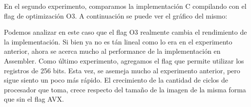 \documentclass[a4paper]{article}
\begin{document}
En el segundo experimento, comparamos la implementación C compilando con el flag de optimización O3. A continuación se puede ver el gráfico del mismo:
\begin{figure}[!ht]
    \centering
    \begin{floatrow}
    \end{floatrow}
\end{figure}
Podemos analizar en este caso que el flag O3 realmente cambia el rendimiento de la implementación. Si bien ya no es tán lineal como lo era en el
experimento anterior, ahora se acerca mucho al performance de la implementación en Assembler.
\newline
Como último experimento, agregamos el flag que permite utilizar los registros de 256 bits. Esta vez, se asemeja mucho al experimento anterior, pero
sigue siento un poco más rápido. El crecimiento de la cantidad de ciclos de procesador que toma, crece respecto del tamaño de la imagen de la misma
forma que sin el flag AVX.
\end{document}
